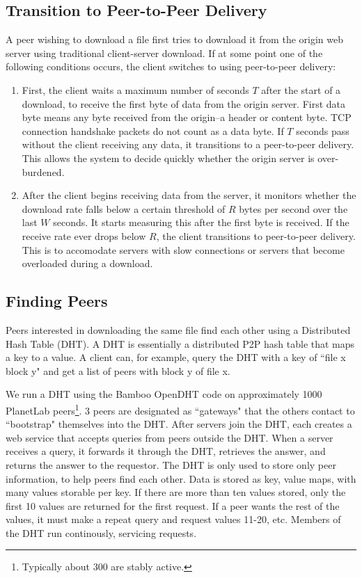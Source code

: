 \subsection{Transition to Peer-to-Peer Delivery}

A peer wishing to download a file first tries to download it from the origin web server using traditional client-server download.  
If at some point one of the following conditions occurs, the client switches to using 
peer-to-peer delivery:
\begin{enumerate}
\item First, the client waits a maximum number of seconds $T$ after the start of a download, to receive the first byte of data from the origin server.  
First data byte means any byte received from the origin--a header or content byte.  TCP connection handshake packets do not count as a data byte.
If $T$ seconds pass without the client receiving any data, it transitions to a peer-to-peer delivery.  This allows the system to decide quickly whether the origin server is over-burdened.   
\item After the client begins receiving data from the server, it monitors whether the download rate falls below a certain 
threshold of $R$ bytes per second over the last $W$ seconds.  It starts measuring this after the first byte is received.  
If the receive rate ever drops below $R$, the client transitions to peer-to-peer delivery.  
This is to accomodate servers with slow connections or servers that become overloaded during a download.
\end{enumerate}

\subsection{Finding Peers}

Peers interested in downloading the same file find each other using a Distributed Hash Table (DHT).
A DHT is essentially a distributed P2P hash table that maps a key to a value.  A client can,
for example, query the DHT with a key of ``file x block y" and get a list of peers with block y
of file x.

We run a DHT using the Bamboo OpenDHT code on approximately 1000 PlanetLab peers\footnote{Typically about 300 are stably active.}.  
3 peers are designated as ``gateways" that the others contact to ``bootstrap" themselves into the DHT.  After servers join the DHT, each 
creates a web service that accepts queries from peers outside the DHT.  When a server receives a
query, it forwards it through the DHT, retrieves the answer, and returns the answer to the requestor. The DHT is only used to store only peer information, 
to help peers find each other.
Data is stored as key, value maps, with many values storable per key.  If there are more than ten values stored, only the first 10 values are returned for the first request. 
If a peer wants the rest of the values, it must make a repeat query and request values 11-20, etc.  Members of the DHT run continously, servicing requests.

